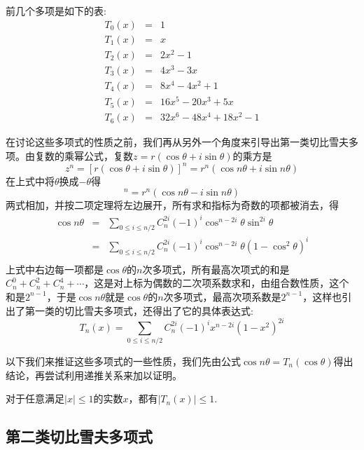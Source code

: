 前几个多项是如下的表:
\begin{eqnarray*}
  T_0(x) & = & 1 \\
  T_1(x) & = & x \\
  T_2(x) & = & 2x^2-1 \\
  T_3(x) & = & 4x^3-3x \\
  T_4(x) & = & 8x^4-4x^2+1 \\
  T_5(x) & = & 16x^5-20x^3+5x \\
  T_6(x) & = & 32x^6-48x^4+18x^2-1
\end{eqnarray*}

在讨论这些多项式的性质之前，我们再从另外一个角度来引导出第一类切比雪夫多项。由复数的乘幂公式，复数$z=r(\cos{\theta}+i\sin{\theta})$的乘方是
\begin{equation*}
  z^n=[r(\cos{\theta}+i\sin{\theta})]^n = r^n(\cos{n\theta}+i\sin{n\theta})
\end{equation*}
在上式中将$\theta$换成$-\theta$得
\begin{equation*}
  [r(\cos{\theta}-i\sin{\theta})]^n = r^n(\cos{n\theta}-i\sin{n\theta})
\end{equation*}
两式相加，并按二项定理将左边展开，所有求和指标为奇数的项都被消去，得
\begin{eqnarray*}
  \cos{n\theta} & = & \sum_{0 \leqslant i \leqslant n/2}C_n^{2i}(-1)^i\cos^{n-2i}{\theta}\sin^{2i}{\theta} \\
  & = & \sum_{0 \leqslant i \leqslant n/2}C_n^{2i}(-1)^i\cos^{n-2i}{\theta}(1-\cos^2{\theta})^i \\
\end{eqnarray*}
上式中右边每一项都是$\cos{\theta}$的$n$次多项式，所有最高次项式的和是$C_n^0+C_n^2+C_n^4+\cdots$，这是对上标为偶数的二次项系数求和，由组合数性质，这个和是$2^{n-1}$，于是$\cos{n\theta}$就是$\cos{\theta}$的$n$次多项式，最高次项系数是$2^{n-1}$，这样也引出了第一类的切比雪夫多项式，还得出了它的具体表达式:
\begin{equation*}
  T_n(x) = \sum_{0 \leqslant i \leqslant n/2}C_n^{2i}(-1)^ix^{n-2i}(1-x^2)^{2i}
\end{equation*}

以下我们来推证这些多项式的一些性质，我们先由公式$\cos{n\theta}=T_n(\cos{\theta})$得出结论，再尝试利用递推关系来加以证明。

\begin{property}
  对于任意满足$|x|\leqslant 1$的实数$x$，都有$|T_n(x)| \leqslant 1$.
\end{property}



\subsection{第二类切比雪夫多项式}
\label{sec:second-chebyshev-polynome}



